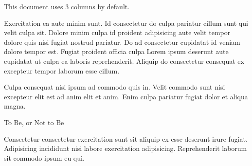 




\vspace{\mktsLineheight}\begin{multicols}{3}\raggedcolumns{}

This document uses 3 columns by default.

Exercitation ea aute minim sunt. Id consectetur do culpa pariatur cillum sunt qui velit culpa sit. Dolore minim culpa id proident adipisicing aute velit tempor dolore quis nisi fugiat nostrud pariatur. Do ad consectetur cupidatat id veniam dolore tempor est. Fugiat proident officia culpa Lorem ipsum deserunt aute cupidatat ut culpa ea laboris reprehenderit. Aliquip do consectetur consequat ex excepteur tempor laborum esse cillum.



\end{multicols}

\mktsRuleSwell{}

\vspace{\mktsLineheight}\begin{multicols}{3}\raggedcolumns{}

Culpa consequat nisi ipsum ad commodo quis in. Velit commodo sunt nisi excepteur elit est ad anim elit et anim. Enim culpa pariatur fugiat dolor et aliqua magna.



\end{multicols}


{\mktsHTwo{}To Be, or Not to Be\mktsHTwoBeg}%


\vspace{\mktsLineheight}\begin{multicols}{3}\raggedcolumns{}Consectetur consectetur exercitation sunt sit aliquip ex esse deserunt irure fugiat. Adipisicing incididunt nisi labore exercitation adipisicing. Reprehenderit laborum sit commodo ipsum eu qui.




\end{multicols}

